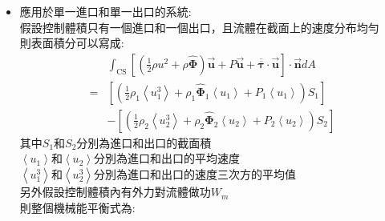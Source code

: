 \documentclass[../main.tex]{subfiles}
\begin{document}
\begin{itemize}
\begin{itemize}
\begin{equation}
      \end{equation}
      因此整個控制體積的機械能平衡式為:
      \begin{equation}
        \frac{d}{dt}\left(
          K_{\text{tot}} + \bm \Phi_{\text{tot}}
        \right) = \int_{\text{CS}} \left[
          \left(
            \frac{1}{2}\rho u^2 + \rho \hat{\bm \Phi}
          \right) \vec{\bm u}
          + P \vec{\bm u}
          + \overline{\overline{\bm \tau}} \cdot \vec{\bm u}
        \right] \cdot \vec{\bm n} dA  + E_c + E_v
      \end{equation}
      其中$K_{\text{tot}}$為控制體積內的總動能:
      \begin{equation}
        K_{\text{tot}} = \int_{\text{CV}} \frac{1}{2}\rho u^2 dV
      \end{equation}
      $\bm \Phi_{\text{tot}}$為控制體積內的總位能:
      \begin{equation}
        \bm \Phi_{\text{tot}} = \int_{\text{CV}} \rho \hat{\bm \Phi} dV
      \end{equation}
    \item 應用於單一進口和單一出口的系統:\\
      假設控制體積只有一個進口和一個出口，且流體在截面上的速度分布均勻\\
      則表面積分可以寫成:
      \begin{align}
        &\int_{\text{CS}} \left[
          \left(
            \frac{1}{2}\rho u^2 + \rho \hat{\bm \Phi}
          \right) \vec{\bm u}
          + P \vec{\bm u}
          + \overline{\overline{\bm \tau}} \cdot \vec{\bm u}
        \right] \cdot \vec{\bm n} dA \nonumber \\
        =& \left[ \left(
          \frac{1}{2}\rho_1 \left<u_1^3\right> + \rho_1 \hat{\bm \Phi}_1 \left<u_1\right> + P_1 \left<u_1\right>
        \right) S_1 \right] \nonumber \\
        &- \left[ \left(
          \frac{1}{2}\rho_2 \left<u_2^3\right> + \rho_2 \hat{\bm \Phi}_2 \left<u_2\right> + P_2 \left<u_2\right>
        \right) S_2 \right]
      \end{align}
      其中$S_1$和$S_2$分別為進口和出口的截面積\\
      $\left<u_1\right>$和$\left<u_2\right>$分別為進口和出口的平均速度\\
      $\left<u_1^3\right>$和$\left<u_2^3\right>$分別為進口和出口的速度三次方的平均值\\
      另外假設控制體積內有外力對流體做功$W_m$\\
      則整個機械能平衡式為:
      \begin{align}

\end{align}
\end{itemize}
\end{itemize}
\end{document}
